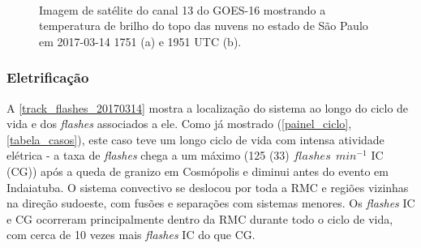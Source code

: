 %
\begin{figure}[hp]
	\begin{center}
		\caption{Imagem de satélite do canal 13 do GOES-16 mostrando a temperatura de brilho do topo das nuvens no estado de São Paulo em 2017-03-14 1751 (a) e 1951 UTC (b).} 
		\label{goes16_sp_20170314}
		 \\
	\end{center}
\end{figure}

\subsubsection{Eletrificação}\label{elec_201703014}

A \autoref{track_flashes_20170314} mostra a localização do sistema ao longo do ciclo de vida e dos \textit{flashes} associados a ele. Como já mostrado (\autoref{painel_ciclo}, \autoref{tabela_casos}), este caso teve um longo ciclo de vida com intensa atividade elétrica - a taxa de \textit{flashes} chega a um máximo (125 (33) $flashes\:\:min^{-1}$ IC (CG)) após a queda de granizo em Cosmópolis e diminui antes do evento em Indaiatuba. O sistema convectivo se deslocou por toda a RMC e regiões vizinhas na direção sudoeste, com fusões e separações com sistemas menores. Os \textit{flashes} IC e CG ocorreram principalmente dentro da RMC durante todo o ciclo de vida, com cerca de 10 vezes mais \textit{flashes} IC do que CG.

